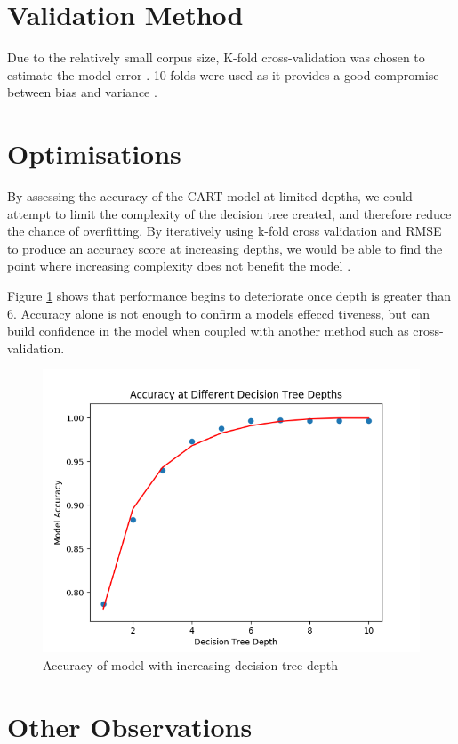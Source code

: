 \documentclass[12pt]{article}
\begin{document}
\section{Validation Method}

Due to the relatively small corpus size, K-fold cross-validation was chosen to estimate the model error \cite{gron_2018}. 10 folds were used as it provides a good compromise between bias and variance \cite{hastie01statisticallearning}.

\section{Optimisations}

By assessing the accuracy of the CART model at limited depths, we could attempt to limit the complexity of the decision tree created, and therefore reduce the chance of overfitting. By iteratively using k-fold cross validation and RMSE to produce an accuracy score at increasing depths, we would be able to find the point where increasing complexity does not benefit the model \cite{massaron_mueller_2015}. 

Figure \ref{fig:depth} shows that performance begins to deteriorate once depth is greater than 6. Accuracy alone is not enough to confirm a models effeccd tiveness, but can build confidence in the model when coupled with another method such as cross-validation.

\begin{figure}[!ht]
\centering
\includegraphics[width=0.8 \linewidth]{images/depth}
\caption{Accuracy of model with increasing decision tree depth}
\label{fig:depth}
\end{figure}

\section{Other Observations}
\end{document}
